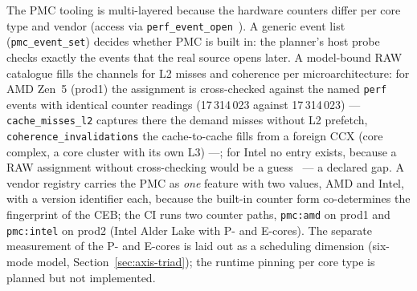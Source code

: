 \begin{nurkurz}
The PMC tooling is multi-layered because the hardware counters differ per core type and vendor (access
via \texttt{perf\_event\_open}~\cite{linux_perf_event_open}). A generic event list
(\texttt{pmc\_event\_set}) decides whether PMC is built in: the planner's host probe checks exactly the
events that the real source opens later. A model-bound RAW catalogue fills the channels for L2 misses
and coherence per microarchitecture: for AMD Zen~5 (prod1) the assignment is cross-checked against the
named \texttt{perf} events with identical counter readings (17\,314\,023 against 17\,314\,023) ---
\texttt{cache\_misses\_l2} captures there the demand misses without L2 prefetch,
\texttt{coherence\_invalidations} the cache-to-cache fills from a foreign CCX (core complex, a core
cluster with its own L3) ---; for Intel no entry exists, because a RAW assignment without
cross-checking would be a guess~\cite{intel_sdm} --- a declared gap. A vendor registry carries the PMC
as \emph{one} feature with two values, AMD and Intel, with a version identifier each, because the
built-in counter form co-determines the fingerprint of the CEB\@; the CI runs two counter paths,
\texttt{pmc:amd} on prod1 and \texttt{pmc:intel} on prod2 (Intel Alder Lake with P- and E-cores). The
separate measurement of the P- and E-cores is laid out as a scheduling dimension (six-mode model,
Section~\ref{sec:axis-triad}); the runtime pinning per core type is planned but not implemented.
\end{nurkurz}

